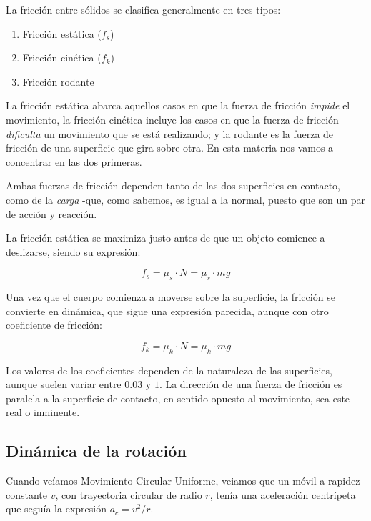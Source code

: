 La fricción entre sólidos se clasifica generalmente en tres tipos:
\begin{enumerate}
    \item Fricción estática (\(f_s\))
    \item Fricción cinética (\(f_k\))
    \item Fricción rodante
\end{enumerate}

La fricción estática abarca aquellos casos en que la fuerza de fricción 
\textit{impide} el movimiento,
la fricción cinética incluye los casos en que la fuerza de fricción 
\textit{dificulta} un movimiento que se está realizando;
y la rodante es la fuerza de fricción de una superficie que gira sobre otra.
En esta materia nos vamos a concentrar en las dos primeras.

Ambas fuerzas de fricción dependen tanto de las dos superficies en contacto,
como de la \textit{carga} -que, como sabemos, es igual a la normal,
puesto que son un par de acción y reacción.

La fricción estática se maximiza justo antes de que un objeto comience a 
deslizarse, siendo su expresión:

\begin{equation*}
    f_s = \mu_s \cdot N = \mu_s \cdot mg
\end{equation*}

Una vez que el cuerpo comienza a moverse sobre la superficie,
la fricción se convierte en dinámica, que sigue una expresión parecida,
aunque con otro coeficiente de fricción:

\begin{equation*}
    f_k = \mu_k \cdot N = \mu_k \cdot mg
\end{equation*}

Los valores de los coeficientes dependen de la naturaleza de las superficies,
aunque suelen variar entre \(0.03\) y \(1\).
La dirección de una fuerza de fricción es paralela a la superficie de contacto,
en sentido opuesto al movimiento, sea este real o inminente.

\subsection{Dinámica de la rotación}

Cuando veíamos Movimiento Circular Uniforme,
veiamos que un móvil a rapidez constante \(v\),
con trayectoria circular de radio \(r\),
tenía una aceleración centrípeta que seguía la expresión \(a_c = v^{2}/r\).

